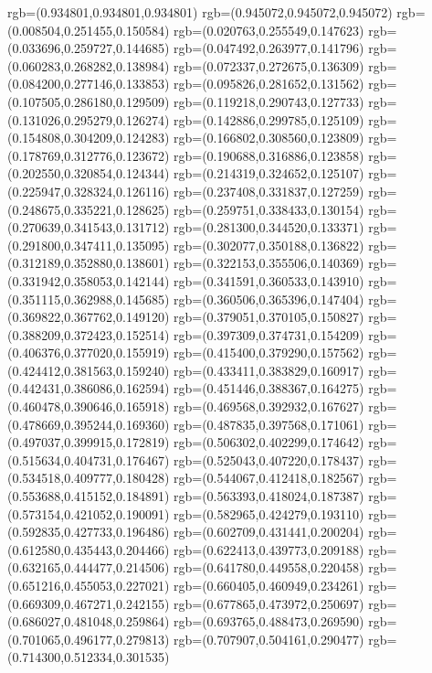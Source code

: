 {{{			rgb=(0.934801,0.934801,0.934801)
			rgb=(0.945072,0.945072,0.945072)
			rgb=(0.008504,0.251455,0.150584)
			rgb=(0.020763,0.255549,0.147623)
			rgb=(0.033696,0.259727,0.144685)
			rgb=(0.047492,0.263977,0.141796)
			rgb=(0.060283,0.268282,0.138984)
			rgb=(0.072337,0.272675,0.136309)
			rgb=(0.084200,0.277146,0.133853)
			rgb=(0.095826,0.281652,0.131562)
			rgb=(0.107505,0.286180,0.129509)
			rgb=(0.119218,0.290743,0.127733)
			rgb=(0.131026,0.295279,0.126274)
			rgb=(0.142886,0.299785,0.125109)
			rgb=(0.154808,0.304209,0.124283)
			rgb=(0.166802,0.308560,0.123809)
			rgb=(0.178769,0.312776,0.123672)
			rgb=(0.190688,0.316886,0.123858)
			rgb=(0.202550,0.320854,0.124344)
			rgb=(0.214319,0.324652,0.125107)
			rgb=(0.225947,0.328324,0.126116)
			rgb=(0.237408,0.331837,0.127259)
			rgb=(0.248675,0.335221,0.128625)
			rgb=(0.259751,0.338433,0.130154)
			rgb=(0.270639,0.341543,0.131712)
			rgb=(0.281300,0.344520,0.133371)
			rgb=(0.291800,0.347411,0.135095)
			rgb=(0.302077,0.350188,0.136822)
			rgb=(0.312189,0.352880,0.138601)
			rgb=(0.322153,0.355506,0.140369)
			rgb=(0.331942,0.358053,0.142144)
			rgb=(0.341591,0.360533,0.143910)
			rgb=(0.351115,0.362988,0.145685)
			rgb=(0.360506,0.365396,0.147404)
			rgb=(0.369822,0.367762,0.149120)
			rgb=(0.379051,0.370105,0.150827)
			rgb=(0.388209,0.372423,0.152514)
			rgb=(0.397309,0.374731,0.154209)
			rgb=(0.406376,0.377020,0.155919)
			rgb=(0.415400,0.379290,0.157562)
			rgb=(0.424412,0.381563,0.159240)
			rgb=(0.433411,0.383829,0.160917)
			rgb=(0.442431,0.386086,0.162594)
			rgb=(0.451446,0.388367,0.164275)
			rgb=(0.460478,0.390646,0.165918)
			rgb=(0.469568,0.392932,0.167627)
			rgb=(0.478669,0.395244,0.169360)
			rgb=(0.487835,0.397568,0.171061)
			rgb=(0.497037,0.399915,0.172819)
			rgb=(0.506302,0.402299,0.174642)
			rgb=(0.515634,0.404731,0.176467)
			rgb=(0.525043,0.407220,0.178437)
			rgb=(0.534518,0.409777,0.180428)
			rgb=(0.544067,0.412418,0.182567)
			rgb=(0.553688,0.415152,0.184891)
			rgb=(0.563393,0.418024,0.187387)
			rgb=(0.573154,0.421052,0.190091)
			rgb=(0.582965,0.424279,0.193110)
			rgb=(0.592835,0.427733,0.196486)
			rgb=(0.602709,0.431441,0.200204)
			rgb=(0.612580,0.435443,0.204466)
			rgb=(0.622413,0.439773,0.209188)
			rgb=(0.632165,0.444477,0.214506)
			rgb=(0.641780,0.449558,0.220458)
			rgb=(0.651216,0.455053,0.227021)
			rgb=(0.660405,0.460949,0.234261)
			rgb=(0.669309,0.467271,0.242155)
			rgb=(0.677865,0.473972,0.250697)
			rgb=(0.686027,0.481048,0.259864)
			rgb=(0.693765,0.488473,0.269590)
			rgb=(0.701065,0.496177,0.279813)
			rgb=(0.707907,0.504161,0.290477)
			rgb=(0.714300,0.512334,0.301535)
}}}
